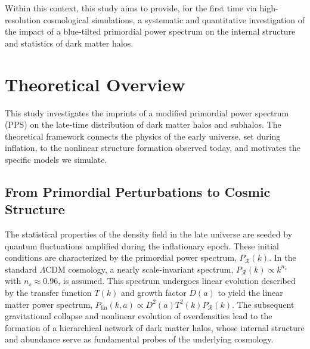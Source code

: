 \documentclass[
 reprint,
 superscriptaddress,
 nofootinbib,
 nobibnotes,
 amsmath,
 amssymb,
 aps,
 prd,
 floatfix,
 longbibliography
]{revtex4-1}
\begin{document}
Within this context, this study aims to provide, for the first time via high-resolution cosmological simulations, a systematic and quantitative investigation of the impact of a blue-tilted primordial power spectrum on the internal structure and statistics of dark matter halos.

\section{Theoretical Overview}
\label{sec:theory}

This study investigates the imprints of a modified primordial power spectrum (PPS) on the late-time distribution of dark matter halos and subhalos. The theoretical framework connects the physics of the early universe, set during inflation, to the nonlinear structure formation observed today, and motivates the specific models we simulate.

\subsection{From Primordial Perturbations to Cosmic Structure}
The statistical properties of the density field in the late universe are seeded by quantum fluctuations amplified during the inflationary epoch. These initial conditions are characterized by the primordial power spectrum, $P_{\mathcal{R}}(k)$. In the standard $\Lambda$CDM cosmology, a nearly scale-invariant spectrum, $P_{\mathcal{R}}(k) \propto k^{n_s}$ with $n_s \approx 0.96$, is assumed. This spectrum undergoes linear evolution described by the transfer function $T(k)$ and growth factor $D(a)$ to yield the linear matter power spectrum, $P_{\mathrm{lin}}(k, a) \propto D^2(a) T^2(k) P_{\mathcal{R}}(k)$. The subsequent gravitational collapse and nonlinear evolution of overdensities lead to the formation of a hierarchical network of dark matter halos, whose internal structure and abundance serve as fundamental probes of the underlying cosmology.
\end{document}
